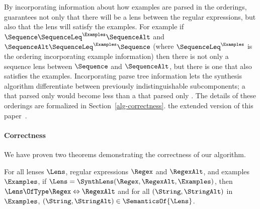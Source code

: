 \documentclass[acmsmall,screen]{acmart}
\begin{document}


By incorporating information about how examples are parsed in the
orderings,
\SynthLens{} guarantees not only that there will be a lens between the regular
expressions, but also
that the lens will satisfy the examples.
For example if
$\Sequence \SequenceLeq^{\Examples} \SequenceAlt$ and
$\SequenceAlt \SequenceLeq^{\Examples} \Sequence$ (where
$\SequenceLeq^{\Examples}$ is the ordering incorporating example information)
then there is not only a
sequence lens between $\Sequence$ and $\SequenceAlt$, but there is one that also
satisfies the examples.
Incorporating parse tree information lets the synthesis algorithm differentiate
between previously indistinguishable
subcomponents; a \TextChar{} that parsed only  would become
less than a \TextChar{} that parsed only .  The details of
these orderings are formalized in
\ifappendices
Section~\ref{alg-correctness}.
\else
the extended version of this paper~\cite{extended-version}.
\fi

\paragraph*{Correctness}
We have proven two theorems demonstrating the correctness of our algorithm.

\begin{theorem}
  \label{thm:alg-soundness}
  For all lenses $\Lens$, regular expressions $\Regex$ and $\RegexAlt$, and
  examples $\Examples$, 
  if $\Lens = \SynthLens(\Regex,\RegexAlt,\Examples)$, then
  $\Lens \OfType \Regex \Leftrightarrow \RegexAlt$ and for all
  $(\String,\StringAlt)$ in $\Examples$, $(\String,\StringAlt) \in
  \SemanticsOf{\Lens}$.
\end{theorem}
\end{document}
